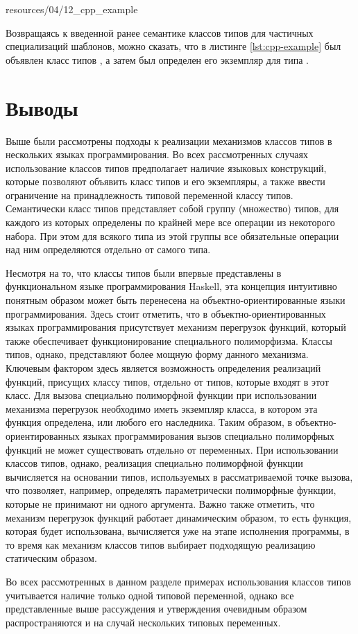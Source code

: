  
{resources/04/12_cpp_example}

Возвращаясь к введенной ранее семантике классов типов для частичных специализаций шаблонов, можно сказать, что в листинге \ref{lst:cpp-example} был объявлен класс типов , а затем был определен его экземпляр для типа . 

\section{Выводы \label{sct:overview-conclusion}}

Выше были рассмотрены подходы к реализации механизмов классов типов в нескольких языках программирования. Во всех рассмотренных случаях использование классов типов предполагает наличие языковых конструкций, которые позволяют объявить класс типов и его экземпляры, а также ввести ограничение на принадлежность типовой переменной классу типов. Семантически класс типов представляет собой группу (множество) типов, для каждого из которых определены по крайней мере все операции из некоторого набора. При этом для всякого типа из этой группы все обязательные операции над ним определяются отдельно от самого типа. 

Несмотря на то, что классы типов были впервые представлены в функциональном языке программирования Haskell, эта концепция интуитивно понятным образом может быть перенесена на объектно-ориентированные языки программирования. Здесь стоит отметить, что в объектно-ориентированных языках программирования присутствует механизм перегрузок функций, который также обеспечивает функционирование специального полиморфизма. Классы типов, однако, представляют более мощную форму данного механизма. Ключевым фактором здесь является возможность определения реализаций функций, присущих классу типов, отдельно от типов, которые входят в этот класс. Для вызова специально полиморфной функции при использовании механизма перегрузок необходимо иметь экземпляр класса, в котором эта функция определена, или любого его наследника. Таким образом, в объектно-ориентированных языках программирования вызов специально полиморфных функций не может существовать отдельно от переменных. При использовании классов типов, однако, реализация специально полиморфной функции вычисляется на основании типов, используемых в рассматриваемой точке вызова, что позволяет, например, определять параметрически полиморфные функции, которые не принимают ни одного аргумента. Важно также отметить, что механизм перегрузок функций работает динамическим образом, то есть функция, которая будет использована, вычисляется уже на этапе исполнения программы, в то время как механизм классов типов выбирает подходящую реализацию статическим образом.

Во всех рассмотренных в данном разделе примерах использования классов типов учитывается наличие только одной типовой переменной, однако все представленные выше рассуждения и утверждения очевидным образом распространяются и на случай нескольких типовых переменных.